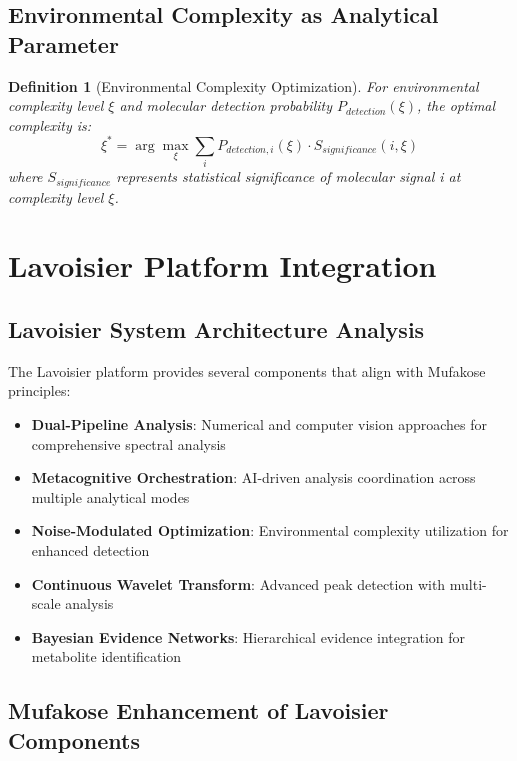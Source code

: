 \documentclass[12pt,a4paper]{article}
\newtheorem{definition}{Definition}
\begin{document}
\subsection{Environmental Complexity as Analytical Parameter}

\begin{definition}[Environmental Complexity Optimization]
For environmental complexity level $\xi$ and molecular detection probability $P_{detection}(\xi)$, the optimal complexity is:
\begin{equation}
\xi^* = \arg\max_\xi \sum_i P_{detection,i}(\xi) \cdot S_{significance}(i, \xi)
\end{equation}
where $S_{significance}$ represents statistical significance of molecular signal i at complexity level $\xi$.
\end{definition}

\section{Lavoisier Platform Integration}

\subsection{Lavoisier System Architecture Analysis}

The Lavoisier platform provides several components that align with Mufakose principles:

\begin{itemize}
\item \textbf{Dual-Pipeline Analysis}: Numerical and computer vision approaches for comprehensive spectral analysis
\item \textbf{Metacognitive Orchestration}: AI-driven analysis coordination across multiple analytical modes
\item \textbf{Noise-Modulated Optimization}: Environmental complexity utilization for enhanced detection
\item \textbf{Continuous Wavelet Transform}: Advanced peak detection with multi-scale analysis
\item \textbf{Bayesian Evidence Networks}: Hierarchical evidence integration for metabolite identification
\end{itemize}

\subsection{Mufakose Enhancement of Lavoisier Components}
\end{document}
